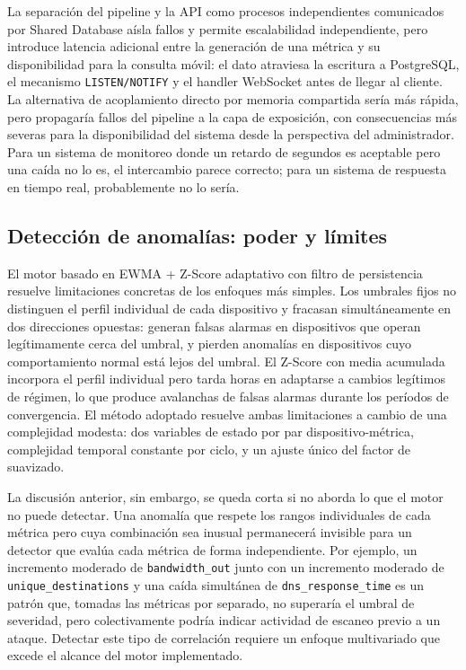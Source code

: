 La separación del pipeline y la API como procesos independientes 
comunicados por Shared Database aísla fallos y permite 
escalabilidad independiente, pero introduce latencia adicional 
entre la generación de una métrica y su disponibilidad para la 
consulta móvil: el dato atraviesa la escritura a PostgreSQL, el 
mecanismo \texttt{LISTEN/NOTIFY} y el handler WebSocket antes de 
llegar al cliente. La alternativa de acoplamiento directo por 
memoria compartida sería más rápida, pero propagaría fallos del 
pipeline a la capa de exposición, con consecuencias más severas 
para la disponibilidad del sistema desde la perspectiva del 
administrador. Para un sistema de monitoreo donde un retardo de 
segundos es aceptable pero una caída no lo es, el intercambio 
parece correcto; para un sistema de respuesta en tiempo real, 
probablemente no lo sería.

\subsection{Detección de anomalías: poder y límites}

El motor basado en EWMA + Z-Score adaptativo con filtro de 
persistencia resuelve limitaciones concretas de los enfoques más 
simples. Los umbrales fijos no distinguen el perfil individual de 
cada dispositivo y fracasan simultáneamente en dos direcciones 
opuestas: generan falsas alarmas en dispositivos que operan 
legítimamente cerca del umbral, y pierden anomalías en 
dispositivos cuyo comportamiento normal está lejos del umbral. El 
Z-Score con media acumulada incorpora el perfil individual pero 
tarda horas en adaptarse a cambios legítimos de régimen, lo que 
produce avalanchas de falsas alarmas durante los períodos de 
convergencia. El método adoptado resuelve ambas limitaciones a 
cambio de una complejidad modesta: dos variables de estado por 
par dispositivo-métrica, complejidad temporal constante por 
ciclo, y un ajuste único del factor de suavizado.

La discusión anterior, sin embargo, se queda corta si no aborda lo 
que el motor no puede detectar. Una anomalía que respete los 
rangos individuales de cada métrica pero cuya combinación sea 
inusual permanecerá invisible para un detector que evalúa cada 
métrica de forma independiente. Por ejemplo, un incremento 
moderado de \texttt{bandwidth\_out} junto con un incremento 
moderado de \texttt{unique\_destinations} y una caída simultánea 
de \texttt{dns\_response\_time} es un patrón que, tomadas las 
métricas por separado, no superaría el umbral de severidad, pero 
colectivamente podría indicar actividad de escaneo previo a un 
ataque. Detectar este tipo de correlación requiere un enfoque 
multivariado que excede el alcance del motor implementado.

